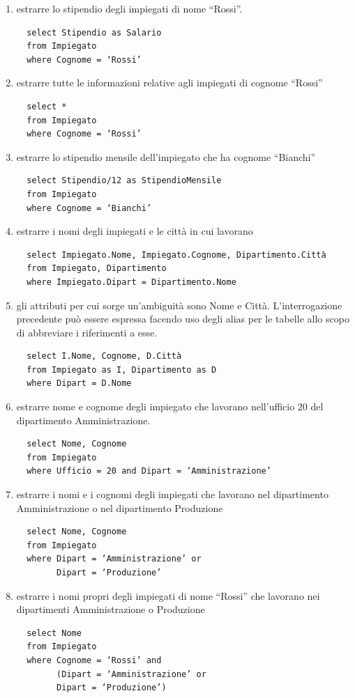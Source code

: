 \documentclass[a4paper]{article}
\begin{document}
\begin{enumerate}[leftmargin=*]
  \item estrarre lo stipendio degli impiegati di nome “Rossi”.
  \begin{verbatim}
  select Stipendio as Salario
  from Impiegato
  where Cognome = ‘Rossi’
  \end{verbatim}

  \item estrarre tutte le informazioni relative agli impiegati di cognome “Rossi”
  \begin{verbatim}
  select *
  from Impiegato
  where Cognome = ‘Rossi’
  \end{verbatim}

  \item estrarre lo stipendio mensile dell’impiegato che ha cognome “Bianchi”
  \begin{verbatim}
  select Stipendio/12 as StipendioMensile
  from Impiegato
  where Cognome = ‘Bianchi’
  \end{verbatim}

  \item estrarre i nomi degli impiegati e le città in cui lavorano
  \begin{verbatim}
  select Impiegato.Nome, Impiegato.Cognome, Dipartimento.Città
  from Impiegato, Dipartimento
  where Impiegato.Dipart = Dipartimento.Nome
  \end{verbatim}

  \item gli attributi per cui sorge un'ambiguità sono Nome e Città. L'interrogazione precedente può essere espressa facendo uso degli alias per le tabelle allo scopo di abbreviare i riferimenti a esse.
  \begin{verbatim}
  select I.Nome, Cognome, D.Città
  from Impiegato as I, Dipartimento as D
  where Dipart = D.Nome
  \end{verbatim}

  \item estrarre nome e cognome degli impiegato che lavorano nell’ufficio 20 del dipartimento Amministrazione.
  \begin{verbatim}
  select Nome, Cognome
  from Impiegato
  where Ufficio = 20 and Dipart = ‘Amministrazione’
  \end{verbatim}

  \item estrarre i nomi e i cognomi degli impiegati che lavorano nel dipartimento Amministrazione o nel dipartimento Produzione
  \begin{verbatim}
  select Nome, Cognome
  from Impiegato
  where Dipart = ‘Amministrazione’ or
        Dipart = ‘Produzione’
  \end{verbatim}

  \item estrarre i nomi propri degli impiegati di nome “Rossi” che lavorano nei dipartimenti Amministrazione o Produzione
  \begin{verbatim}
  select Nome
  from Impiegato
  where Cognome = ‘Rossi’ and
        (Dipart = ‘Amministrazione’ or
        Dipart = ‘Produzione’)
  \end{verbatim}
\end{enumerate}
\end{document}
